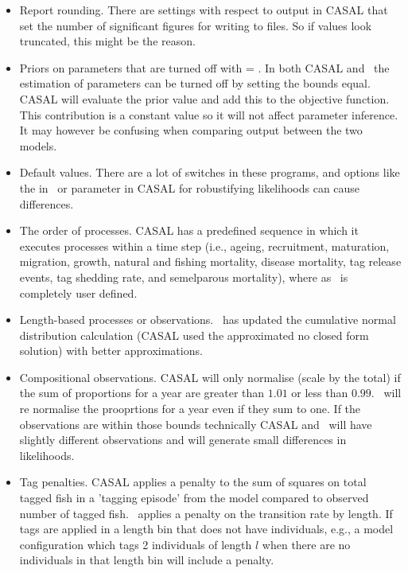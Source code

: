 \begin{itemize}
	\item Report rounding. There are settings with respect to output in CASAL that set the number of significant figures for writing to files. So if values look truncated, this might be the reason.
	
	\item Priors on parameters that are turned off with  = . In both CASAL and \CNAME\ the estimation of parameters can be turned off by setting the bounds equal. CASAL will evaluate the prior value and add this to the objective function.  This contribution is a constant value so it will not affect parameter inference. It may however be confusing when comparing output between the two models.

	\item Default values. There are a lot of switches in these programs, and options like the  in \CNAME\ or  parameter in CASAL for robustifying likelihoods can cause differences.

	\item The order of processes. CASAL has a predefined sequence in which it executes processes within a time step (i.e., ageing, recruitment, maturation, migration, growth, natural and fishing mortality, disease mortality, tag release events, tag shedding rate, and semelparous mortality), where as \CNAME\ is completely user defined.

	\item Length-based processes or observations. \CNAME\ has updated the cumulative normal distribution calculation (CASAL used the approximated no closed form solution) with better approximations.

	\item Compositional observations. CASAL will only normalise (scale by the total) if the sum of proportions for a year are greater than \(1.01\) or less than \(0.99\). \CNAME\ will re normalise the prooprtions for a year even if they sum to one. If the observations are within those bounds technically CASAL and \CNAME\ will have slightly different observations and will generate small differences in likelihoods.

	\item Tag penalties. CASAL applies a penalty to the sum of squares on total tagged fish in a 'tagging episode' from the model compared to observed number of tagged fish. \CNAME\ applies a penalty on the transition rate by length. If tags are applied in a length bin that does not have individuals, e.g., a model configuration which tags 2 individuals of length $l$ when there are no individuals in that length bin will include a penalty.
\end{itemize}

